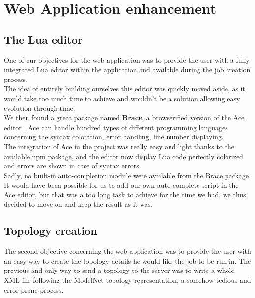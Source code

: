 \documentclass{eplmastersthesis}
\begin{document}
      \section{Web Application enhancement}

        \subsection{The Lua editor}

          One of our objectives for the web application was to provide the user
          with a fully integrated Lua editor within the application and
          available during the job creation process.\\
          The idea of entirely building ourselves this editor was quickly
          moved aside, as it would take too much time to achieve and wouldn't
          be a solution allowing easy evolution through time.\\
          We then found a great package named \textbf{Brace}, a browserified
          version of the Ace editor \cite{Ace}. Ace can handle hundred types
          of different programming languages concerning the syntax coloration,
          error handling, line number displaying.\\

          The integration of Ace in the project was really easy and light thanks
          to the available npm package, and the editor now display Lua code
          perfectly colorized and errors are shown in case of syntax errors.\\

          Sadly, no built-in auto-completion module were available from the
          Brace package. It would have been possible for us to add our own
          auto-complete script in the Ace editor, but that was a too long
          task to achieve for the time we had, we thus decided to move on and
          keep the result as it was.

      \subsection{Topology creation}

          The second objective concerning the web application was to provide the
          user with an easy way to create the topology details he would like
          the job to be run in. The previous and only way to send a topology
          to the server was to write a whole XML file following the ModelNet
          topology representation, a somehow tedious and error-prone process.\\
\end{document}

